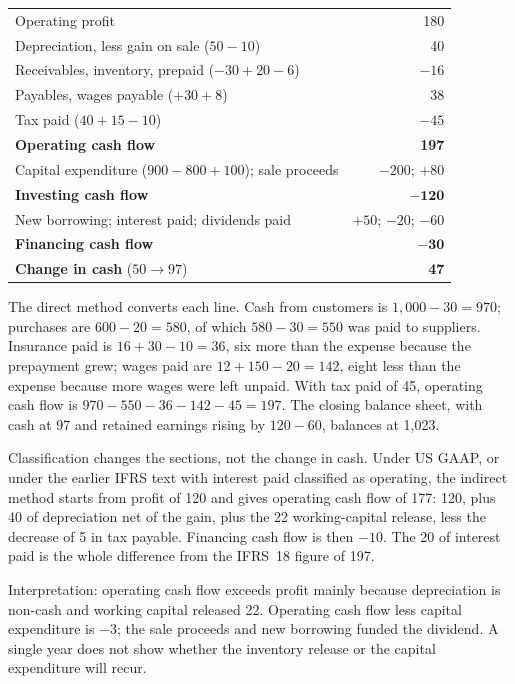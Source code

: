 \begin{qfmethod}
\begin{center}\small
\begin{tabular}{@{}lr@{}}
\toprule
Operating profit & 180 \\
Depreciation, less gain on sale ($50-10$) & 40 \\
Receivables, inventory, prepaid ($-30+20-6$) & $-16$ \\
Payables, wages payable ($+30+8$) & 38 \\
Tax paid ($40+15-10$) & $-45$ \\
\textbf{Operating cash flow} & \textbf{197} \\
Capital expenditure ($900-800+100$); sale proceeds & $-200$; $+80$ \\
\textbf{Investing cash flow} & $\mathbf{-120}$ \\
New borrowing; interest paid; dividends paid & $+50$; $-20$; $-60$ \\
\textbf{Financing cash flow} & $\mathbf{-30}$ \\
\textbf{Change in cash} ($50\to97$) & \textbf{47} \\
\bottomrule
\end{tabular}
\end{center}

The direct method converts each line. Cash from customers is $1{,}000-30=970$; purchases are $600-20=580$, of which $580-30=550$ was paid to suppliers. Insurance paid is $16+30-10=36$, six more than the expense because the prepayment grew; wages paid are $12+150-20=142$, eight less than the expense because more wages were left unpaid. With tax paid of 45, operating cash flow is $970-550-36-142-45=197$. The closing balance sheet, with cash at 97 and retained earnings rising by $120-60$, balances at 1{,}023.

Classification changes the sections, not the change in cash. Under US GAAP, or under the earlier IFRS text with interest paid classified as operating, the indirect method starts from profit of 120 and gives operating cash flow of 177: 120, plus 40 of depreciation net of the gain, plus the 22 working-capital release, less the decrease of 5 in tax payable. Financing cash flow is then $-10$. The 20 of interest paid is the whole difference from the IFRS~18 figure of 197.

Interpretation: operating cash flow exceeds profit mainly because depreciation is non-cash and working capital released 22. Operating cash flow less capital expenditure is $-3$; the sale proceeds and new borrowing funded the dividend. A single year does not show whether the inventory release or the capital expenditure will recur.


\end{qfmethod}
